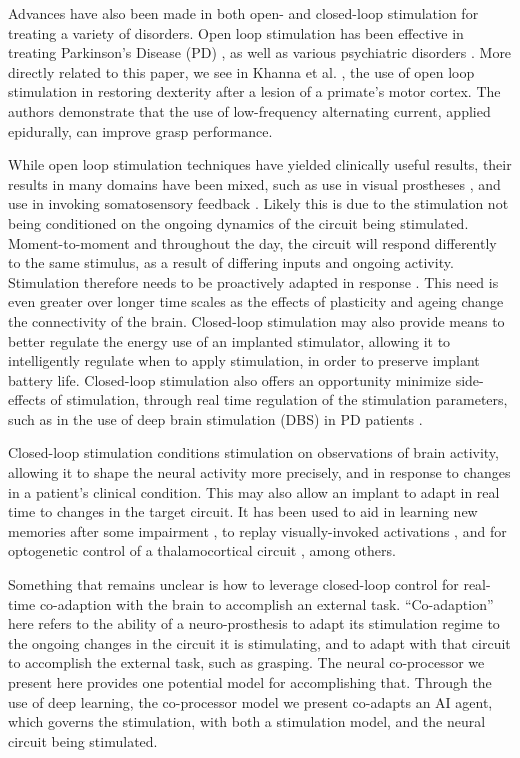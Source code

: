 \documentclass[12pt]{iopart}
\begin{document}
Advances have also been made in both open- and closed-loop stimulation for
treating a variety of disorders. Open loop stimulation has been effective in
treating Parkinson's Disease (PD) \cite{benabid.parkinsons}, as well as various
psychiatric disorders \cite{holtzheimer.psy, kisely.psy, fraint.psy}.
More directly related to this paper, we see in Khanna et al. \cite{khanna.openloop},
the use of open loop stimulation in restoring dexterity after a lesion
of a primate's motor cortex. The authors demonstrate that
the use of low-frequency alternating current, applied epidurally,
can improve grasp performance.

While open loop stimulation techniques have yielded clinically useful results,
their results in many domains have been mixed, such as use in visual
prostheses \cite{bosking.visual}, and use in invoking somatosensory feedback
\cite{cronin.tact}. Likely this is due to the stimulation not being conditioned
on the ongoing dynamics of the circuit being stimulated. Moment-to-moment and
throughout the day, the circuit will respond differently to the same stimulus,
as a result of differing inputs and ongoing activity. Stimulation
therefore needs to be proactively adapted in response \cite{shanechi.stimmodel, castano.pd}.
This need is even greater over longer time scales as the effects of plasticity and ageing change
the connectivity of the brain. Closed-loop stimulation may also provide means
to better regulate the energy use of an implanted stimulator, allowing it to
intelligently regulate when to apply stimulation, in order to preserve implant
battery life. Closed-loop stimulation also offers an opportunity minimize
side-effects of stimulation, through real time regulation
of the stimulation parameters, such as in the use of deep brain stimulation (DBS) in
PD patients \cite{little.park}.

Closed-loop stimulation conditions stimulation on observations of brain activity,
allowing it to shape the neural activity more precisely, and in response to changes
in a patient's clinical condition. This may also allow an implant to adapt
in real time to changes in the target circuit. It has been used to aid in learning
new memories after some impairment \cite{berger.closedloop, kahana.biomarker},
to replay visually-invoked activations \cite{tafazoli.acls}, and for optogenetic
control of a thalamocortical circuit \cite{bolus.opto}, among others.

Something that remains unclear is how to leverage closed-loop control for real-time
co-adaption with the brain to accomplish an external task. ``Co-adaption'' here refers
to the ability of a neuro-prosthesis to adapt its stimulation regime to the ongoing
changes in the circuit it is stimulating, and to adapt with that circuit to accomplish
the external task, such as grasping. The neural co-processor we present here provides one
potential model for accomplishing that. Through the use of deep learning, the
co-processor model we present co-adapts an AI agent, which governs the
stimulation, with both a stimulation model, and the neural circuit being stimulated.
\end{document}
